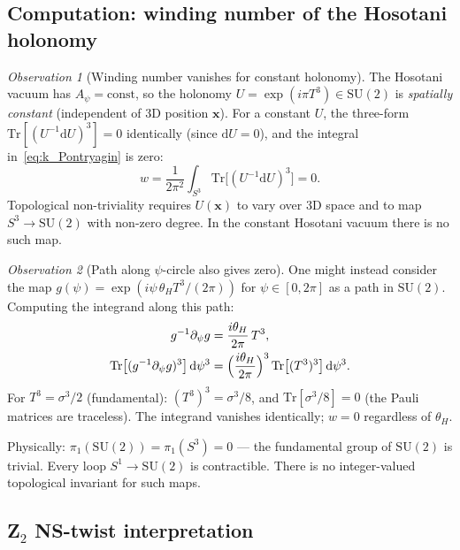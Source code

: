 \documentclass[11pt,a4paper]{article}
\theoremstyle{definition}
\theoremstyle{remark}
\newtheorem{observation}{Observation}
\begin{document}
\subsection{Computation: winding number of the Hosotani holonomy}

\begin{observation}[Winding number vanishes for constant holonomy]
  \label{obs:I2_constant}
  The Hosotani vacuum has $A_\psi = \mathrm{const}$, so the holonomy
  $U = \exp(i\pi T^3) \in \mathrm{SU}(2)$ is \emph{spatially constant}
  (independent of 3D position $\mathbf{x}$).
  For a constant $U$, the three-form $\mathrm{Tr}[(U^{-1}\mathrm{d}U)^3]
  = 0$ identically (since $\mathrm{d}U = 0$), and the integral
  in~\eqref{eq:k_Pontryagin} is zero:
  \begin{equation}
    w = \frac{1}{2\pi^2}\int_{S^3}
      \mathrm{Tr}\bigl[(U^{-1}\mathrm{d}U)^3\bigr] = 0.
    \label{eq:w_zero_constant}
  \end{equation}
  Topological non-triviality requires $U(\mathbf{x})$ to vary over 3D
  space and to map $S^3 \to \mathrm{SU}(2)$ with non-zero degree.
  In the constant Hosotani vacuum there is no such map.
\end{observation}

\begin{observation}[Path along $\psi$-circle also gives zero]
  \label{obs:I2_path}
  One might instead consider the map $g(\psi)
  = \exp(i\psi\,\theta_H T^3 / (2\pi))$ for $\psi \in [0,2\pi]$
  as a path in $\mathrm{SU}(2)$.
  Computing the integrand along this path:
  \begin{align}
    g^{-1}\partial_\psi g
    &= \frac{i\theta_H}{2\pi}\, T^3,
    \\
    \mathrm{Tr}\bigl[(g^{-1}\partial_\psi g)^3\bigr]\,\mathrm{d}\psi^3
    &= \Bigl(\frac{i\theta_H}{2\pi}\Bigr)^3\,
      \mathrm{Tr}\bigl[(T^3)^3\bigr]\,\mathrm{d}\psi^3.
  \end{align}
  For $T^3 = \sigma^3/2$ (fundamental): $(T^3)^3 = \sigma^3/8$, and
  $\mathrm{Tr}[\sigma^3/8] = 0$ (the Pauli matrices are traceless).
  The integrand vanishes identically; $w = 0$ regardless of $\theta_H$.

  Physically: $\pi_1(\mathrm{SU}(2)) = \pi_1(S^3) = 0$ — the
  fundamental group of $\mathrm{SU}(2)$ is trivial.  Every loop
  $S^1 \to \mathrm{SU}(2)$ is contractible.  There is no
  integer-valued topological invariant for such maps.
\end{observation}

\subsection{Z\texorpdfstring{$_2$}{2} NS-twist interpretation}
\end{document}

